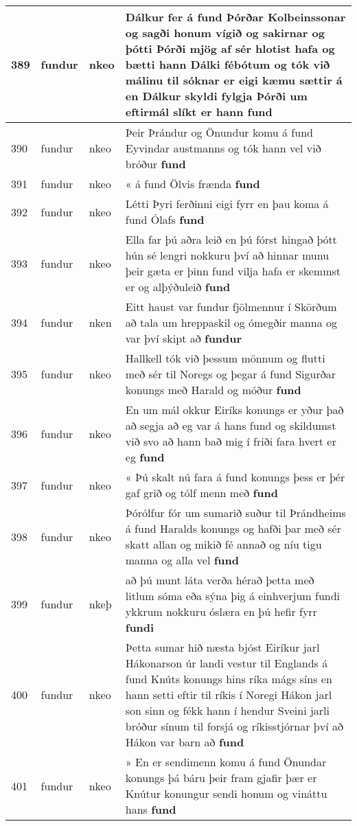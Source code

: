 \documentclass{article}
\begin{document}
\begin{longtable}{p{1cm}|p{1cm}|p{1cm}|p{13cm}}
\hline
389&fundur&nkeo&Dálkur fer á fund Þórðar Kolbeinssonar og sagði honum vígið og sakirnar og þótti Þórði mjög af sér hlotist hafa og bætti hann Dálki fébótum og tók við málinu til sóknar er eigi kæmu sættir á en Dálkur skyldi fylgja Þórði um eftirmál slíkt er hann \textbf{fund} \\
\hline
390&fundur&nkeo&Þeir Þrándur og Önundur komu á fund Eyvindar austmanns og tók hann vel við bróður \textbf{fund} \\
\hline
391&fundur&nkeo&« á fund Ölvis frænda \textbf{fund} \\
\hline
392&fundur&nkeo&Létti Þyri ferðinni eigi fyrr en þau koma á fund Ólafs \textbf{fund} \\
\hline
393&fundur&nkeo&Ella far þú aðra leið en þú fórst hingað þótt hún sé lengri nokkuru því að hinnar munu þeir gæta er þinn fund vilja hafa er skemmst er og alþýðuleið \textbf{fund} \\
\hline
394&fundur&nken&Eitt haust var fundur fjölmennur í Skörðum að tala um hreppaskil og ómegðir manna og var því skipt að \textbf{fundur} \\
\hline
395&fundur&nkeo&Hallkell tók við þessum mönnum og flutti með sér til Noregs og þegar á fund Sigurðar konungs með Harald og móður \textbf{fund} \\
\hline
396&fundur&nkeo&En um mál okkur Eiríks konungs er yður það að segja að eg var á hans fund og skildumst við svo að hann bað mig í friði fara hvert er eg \textbf{fund} \\
\hline
397&fundur&nkeo&« Þú skalt nú fara á fund konungs þess er þér gaf grið og tólf menn með \textbf{fund} \\
\hline
398&fundur&nkeo&Þórólfur fór um sumarið suður til Þrándheims á fund Haralds konungs og hafði þar með sér skatt allan og mikið fé annað og níu tigu manna og alla vel \textbf{fund} \\
\hline
399&fundur&nkeþ&að þú munt láta verða hérað þetta með litlum sóma eða sýna þig á einhverjum fundi ykkrum nokkuru óslæra en þú hefir fyrr \textbf{fundi} \\
\hline
400&fundur&nkeo&Þetta sumar hið næsta bjóst Eiríkur jarl Hákonarson úr landi vestur til Englands á fund Knúts konungs hins ríka mágs síns en hann setti eftir til ríkis í Noregi Hákon jarl son sinn og fékk hann í hendur Sveini jarli bróður sínum til forsjá og ríkisstjórnar því að Hákon var barn að \textbf{fund} \\
\hline
401&fundur&nkeo&» En er sendimenn komu á fund Önundar konungs þá báru þeir fram gjafir þær er Knútur konungur sendi honum og vináttu hans \textbf{fund} \\

\end{longtable}
\end{document}
